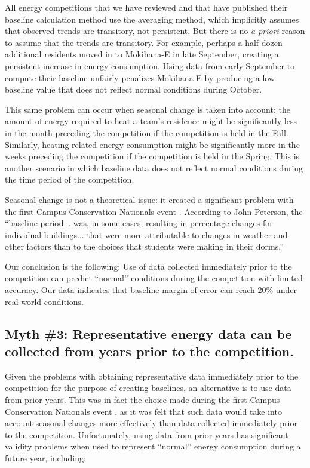 \documentclass[jou]{apa} %
\begin{document}
All energy competitions that we have reviewed and that have published their baseline
calculation method use the averaging method, which implicitly assumes that observed trends
are transitory, not persistent.  But there is no {\em a priori} reason to assume that the
trends are transitory.  For example, perhaps a half dozen additional residents moved in to
Mokihana-E in late September, creating a persistent increase in energy consumption.  Using
data from early September to compute their baseline unfairly penalizes Mokihana-E by
producing a low baseline value that does not reflect normal conditions during October.

This same problem can occur when seasonal change is taken into account: the amount of
energy required to heat a team's residence might be significantly less in the month
preceding the competition if the competition is held in the Fall. Similarly,
heating-related energy consumption might be significantly more in the weeks preceding the
competition if the competition is held in the Spring.  This is another scenario in which
baseline data does not reflect normal conditions during the time period of the competition.

Seasonal change is not a theoretical issue: it created a significant problem with the
first Campus Conservation Nationals event \cite{Willens2010}.  According to John Peterson,
the ``baseline period... was, in some cases, resulting in percentage changes for
individual buildings... that were more attributable to changes in weather and other
factors than to the choices that students were making in their dorms.''

Our conclusion is the following:  Use of data collected immediately prior to the
competition can predict ``normal'' conditions during the competition with limited
accuracy. Our data indicates that baseline margin of error can reach 20\% under real
world conditions.

\subsection{Myth \#3: Representative energy data can be collected from years  prior to the competition.}

Given the problems with obtaining representative data immediately prior to the competition
for the purpose of creating baselines, an alternative is to use data from prior years.
This was in fact the choice made during the first Campus Conservation Nationals event
\cite{Willens2010}, as it was felt that such data would take into account seasonal changes
more effectively than data collected immediately prior to the competition. Unfortunately,
using data from prior years has significant validity problems when used to represent
``normal'' energy consumption during a future year, including:
\end{document}
